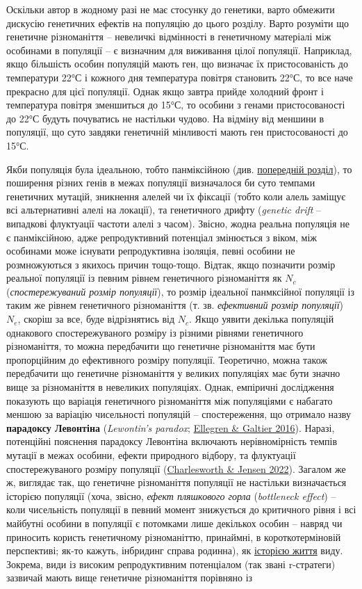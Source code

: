 \documentclass[
  11pt,
]{book}
\begin{document}
Оскільки автор в жодному разі не має стосунку до генетики, варто обмежити дискусію генетичних ефектів на популяцію до цього розділу. Варто розуміти що генетичне різноманіття -- невеличкі відмінності в генетичному матеріалі між особинами в популяції -- є визначним для виживання цілої популяції. Наприклад, якщо більшість особин популяцій мають ген, що визначає їх пристосованість до температури 22°С і кожного дня температура повітря становить 22°С, то все наче прекрасно для цієї популяції. Однак якщо завтра прийде холодний фронт і температура повітря зменшиться до 15°С, то особини з генами пристосованості до 22°С будуть почуватись не настільки чудово. На відміну від меншини в популяції, що суто завдяки генетичній мінливості мають ген пристосованості до 15°С.

Якби популяція була ідеальною, тобто панміксійною (див. \hyperref[population]{попередній розділ}), то поширення різних генів в межах популяції визначалося би суто темпами генетичних мутацій, зникнення алелей чи їх фіксації (тобто коли алель заміщує всі альтернативні алелі на локації), та генетичного дрифту (\emph{genetic drift} -- випадкові флуктуації частоти алелі з часом). Звісно, жодна реальна популяція не є панміксійною, адже репродуктивний потенціал змінюється з віком, між особинами може існувати репродуктивна ізоляція, певні особини не розмножуються з якихось причин тощо-тощо. Відтак, якщо позначити розмір реальної популяції із певним рівнем генетичного різноманіття як \(N_c\) (\emph{спостережуваний розмір популяції}), то розмір ідеальної панмксійної популяції із таким же рівнем генетичного різноманіття (т. зв. \emph{ефективний розмір популяції}) \(N_e\), скоріш за все, буде відрізнятись від \(N_c\). Якщо уявити декілька популяцій однакового спостережуваного розміру із різними рівнями генетичного різноманіття, то можна передбачити що генетичне різноманіття має бути пропорційним до ефективного розміру популяції. Теоретично, можна також передбачити що генетичне різноманіття у великих популяціях має бути значно вище за різноманіття в невеликих популяціях. Однак, емпіричні дослідження показують що варіація генетичного різноманіття між популяціями є набагато меншою за варіацію чисельності популяцій -- спостереження, що отримало назву \textbf{парадоксу Левонтіна} (\emph{Lewontin's paradox}; \href{https://doi.org/10.1038/nrg.2016.58}{Ellegren \& Galtier 2016}). Наразі, потенційні пояснення парадоксу Левонтіна включають нерівномірність темпів мутації в межах особини, ефекти природного відбору, та флуктуації спостережуваного розміру популяції (\href{https://doi.org/10.1093/gbe/evac096}{Charlesworth \& Jensen 2022}). Загалом же ж, виглядає так, що генетичне різноманіття популяції не настільки визначається історією популяції (хоча, звісно, \emph{ефект пляшкового горла} (\emph{bottleneck effect}) -- коли чисельність популяції в певний момент знижується до критичного рівня і всі майбутні особини в популяції є потомками лише декількох особин -- навряд чи приносить користь генетичному різноманіттю, принаймні, в короткотерміновій перспективі; як-то кажуть, інбридинг справа родинна), як \hyperref[life-history]{історією життя} виду. Зокрема, види із високим репродуктивним потенціалом (так звані r-стратеги) зазвичай мають вище генетичне різноманіття порівняно із 
\end{document}
